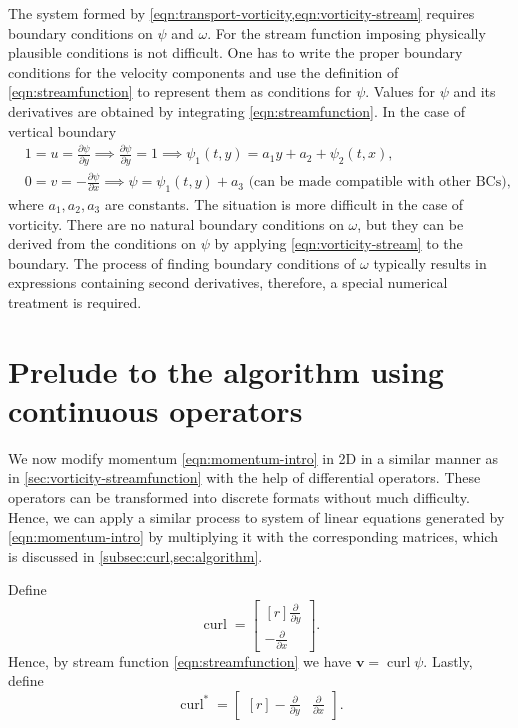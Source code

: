 \documentclass{article}
\numberwithin{equation}{section}
\begin{document}
	The system  formed by \cref{eqn:transport-vorticity,eqn:vorticity-stream} requires boundary conditions on $\psi$ and $\omega$. 
		For the stream function imposing physically plausible conditions is not difficult. 
		One has to write the proper boundary conditions for the velocity components and use the definition of \cref{eqn:streamfunction} to represent them as  conditions for $\psi$. 
		Values for $\psi$ and its derivatives are obtained by integrating \cref{eqn:streamfunction}. In the case of vertical boundary 
		\begin{align}
			&1=u=\frac{\partial\psi}{\partial y}\implies\frac{\partial\psi}{\partial y}=1\implies\psi_1(t,y)=a_1y+a_2+\psi_2(t,x),\\
			&0=v=-\frac{\partial\psi}{\partial x}\implies\psi=\psi_1(t,y)+a_3\text{ (can be made compatible with other BCs)},		
		\end{align}
		where $a_1,a_2,a_3$ are constants. The situation is more difficult in the case of vorticity.
		There are no natural boundary conditions on $\omega$, but they can be derived from the conditions on $\psi$ by applying \cref{eqn:vorticity-stream} to the boundary. 
		The process of finding boundary conditions of $\omega$ typically results in expressions containing second derivatives, therefore, a special numerical treatment is required.





\pagebreak
\section{Prelude to the algorithm using continuous operators} \label{sec:prelude-algorithm}
We now modify momentum \cref{eqn:momentum-intro} in 2D in a similar manner as in \cref{sec:vorticity-streamfunction} with the help of differential operators. These operators can be transformed into discrete formats without much difficulty. Hence, we can apply a similar process to system of linear equations generated by \cref{eqn:momentum-intro} by multiplying it with the corresponding matrices, which is discussed in \cref{subsec:curl,sec:algorithm}. 

Define
\begin{equation}
	\operatorname{curl}
	=
	\begin{bmatrix*}[r]
	\frac{\partial}{\partial y} \\
	-\frac{\partial}{\partial x}
	\end{bmatrix*}.
\end{equation}
Hence, by stream function \cref{eqn:streamfunction} we have $\boldsymbol{v}=\operatorname{curl}\psi$. Lastly, define
\begin{equation}
	\operatorname{curl}^*
	=
	\begin{bmatrix*}[r]
	-\frac{\partial}{\partial y}&
	\frac{\partial}{\partial x}
	\end{bmatrix*}.
\end{equation}
\end{document}

